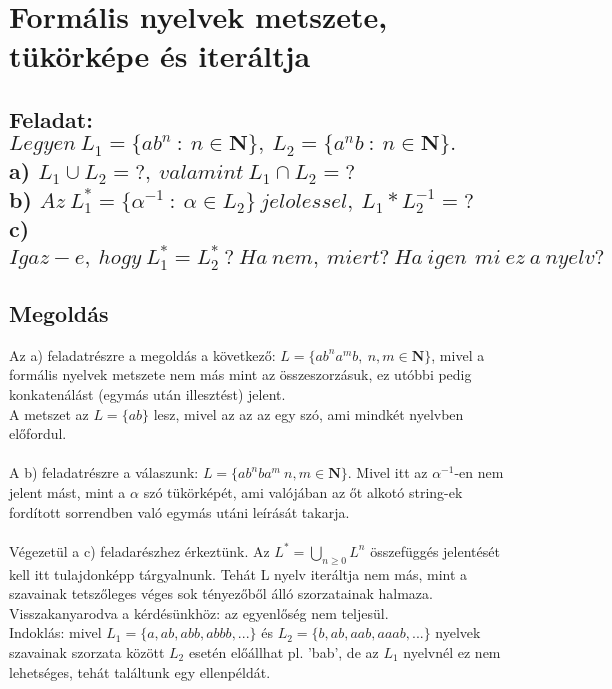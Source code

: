 \documentclass[12pt]{article}
\begin{document}
\section{Formális nyelvek metszete, tükörképe és iteráltja}
\subsection{Feladat: \\
$ Legyen \ L_{1}=\{ ab^{n} \ : \ n \in \mathbf{N} \}, \ L_{2}=\{ a^{n}b \ : \ n \in \mathbf{N} \} .$ \\
a) $ L_{1} \cup L_{2} = ?, \ valamint\ L_{1} \cap L_{2} = ? $ \\
b) $ Az \ L_{1}^{*} = \{\alpha^{-1} \ : \ \alpha \in L_{2} \} \ jelolessel, \ L_{1}*L_{2}^{-1}=? $ \\
c) $ Igaz-e, \ hogy \ L_{1}^{*}=L_{2}^{*} \ ? \ Ha\ nem,\ miert?\ Ha\ igen\,\ mi\ ez\ a\ nyelv? $}
\maketitle
\subsection{Megoldás}
Az a) feladatrészre a megoldás a következő: $ L = \{ ab^{n}a^{m}b, \ n,m \in \mathbf{N} \}$, 
mivel a formális nyelvek metszete nem más
mint az összeszorzásuk, ez utóbbi pedig konkatenálást (egymás után illesztést) jelent. \\
A metszet az $ L=\{ ab \} $ lesz, mivel az az az egy szó, ami mindkét nyelvben előfordul. \\\\
A b) feladatrészre a válaszunk: $ L = \{ ab^{n}ba^{m} \ n,m \in \mathbf{N} \} $.
Mivel itt az $ \alpha^{-1} $-en nem jelent mást, mint a $ \alpha $ szó tükörképét, ami valójában az őt alkotó
string-ek fordított sorrendben való egymás utáni leírását takarja. \\\\
Végezetül a c) feladarészhez érkeztünk. Az $ L^{*} = \bigcup_{n \geq 0} L^{n} $ összefüggés jelentését
kell itt tulajdonképp tárgyalnunk. Tehát L nyelv iteráltja nem más, mint a szavainak tetszőleges véges sok
tényezőből álló szorzatainak halmaza. Visszakanyarodva a kérdésünkhöz: az egyenlőség nem teljesül. \\
Indoklás: mivel $ L_{1}=\{ a, ab, abb, abbb, ... \} $ és $ L_{2}=\{ b, ab, aab, aaab, ... \} $ nyelvek szavainak
szorzata között $L_{2}$ esetén előállhat pl. 'bab', de az $L_{1}$ nyelvnél ez nem lehetséges, tehát találtunk
egy ellenpéldát.
\end{document}

